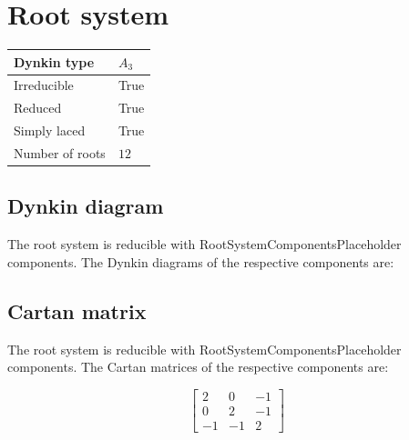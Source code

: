 \documentclass[11pt]{article}
\theoremstyle{definition}
\newif\ifrootsystemirreducible
\begin{document}
\newpage
\section{Root system}

\begin{tabular}{|l|l|}
	\hline
    Dynkin type & $A_3$ \\
	\hline
    Irreducible & True \\
	\hline
    Reduced & True \\
	\hline
	Simply laced & True \\
	\hline
	Number of roots & $12$ \\
	\hline
\end{tabular}

\subsection{Dynkin diagram}

\ifrootsystemirreducible
The root system is irreducible and has Dynkin diagram:
\else
The root system is reducible with RootSystemComponentsPlaceholder components. The Dynkin diagrams of the respective components are:
\fi

\begin{center}
\end{center}

\subsection{Cartan matrix}

\ifrootsystemirreducible
The root system is irreducible and has Cartan matrix:
\else
The root system is reducible with RootSystemComponentsPlaceholder components. The Cartan matrices of the respective components are:
\fi

\[
\left[\begin{matrix}2 & 0 & -1\\0 & 2 & -1\\-1 & -1 & 2\end{matrix}\right]
\]
\end{document}
